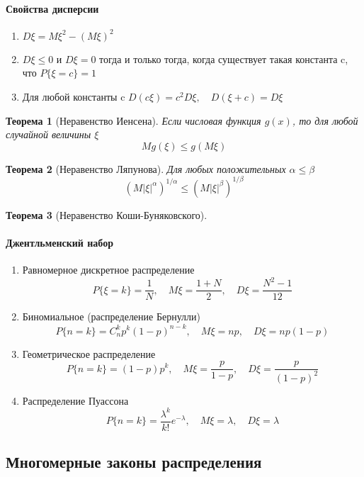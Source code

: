 \documentclass[a4paper]{article}
\newtheorem{theorem}{Теорема}[section]
\theoremstyle{definition}
\theoremstyle{remark}
\begin{document}
\paragraph*{Свойства дисперсии}
\begin{enumerate}
    \item $D\xi = M\xi^2 - (M\xi)^2$
    \item $D\xi\leq 0$ и $D\xi = 0$ тогда и только тогда, когда существует такая константа c, что $P\{\xi = c\} = 1$
    \item Для любой константы c $D(c\xi) = c^2 D\xi, \quad D(\xi +c) = D\xi$
\end{enumerate}
\begin{theorem}[Неравенство Иенсена]
    Если числовая функция $g(x)$, то для любой случайной величины $\xi$
    \[Mg(\xi)\leq g(M\xi)\]
\end{theorem}
\begin{theorem}[Неравенство Ляпунова]
    Для любых положительных $\alpha \leq \beta$
    \[(M|\xi|^\alpha)^{1/ \alpha}\leq (M|\xi|^\beta)^{1/ \beta}\]
\end{theorem}
\begin{theorem}[Неравенство Коши-Буняковского]
    
\end{theorem}
\paragraph*{Джентльменский набор}
\begin{enumerate}
    \item Равномерное дискретное распределение
    \[P\{\xi=k\} = \frac{1}{N}, \quad M\xi = \frac{1+N}{2}, \quad D\xi = \frac{N^2-1}{12}\]
    \item Биномиальное (распределение Бернулли)
    \[P\{n=k\}=C_n^k p^k (1-p)^{n-k}, \quad M\xi = np, \quad D\xi = np(1-p)\]
    \item Геометрическое распределение
    \[P\{n=k\}=(1-p)p^k, \quad M\xi = \frac{p}{1-p}, \quad D\xi = \frac{p}{(1-p)^2}\]
    \item Распределение Пуассона
    \[P\{n=k\}=\frac{\lambda^k}{k!}e^{-\lambda}, \quad M\xi = \lambda, \quad D\xi = \lambda\]
    
\end{enumerate} 
\subsection{Многомерные законы распределения}
\end{document}
